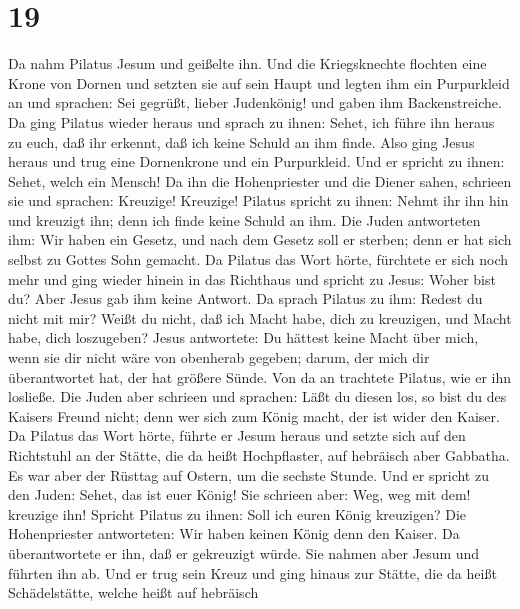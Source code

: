 \hypertarget{section-18}{%
\section{19}\label{section-18}}

 Da nahm Pilatus Jesum und geißelte ihn.  Und
die Kriegsknechte flochten eine Krone von Dornen und setzten sie auf
sein Haupt und legten ihm ein Purpurkleid an  und sprachen:
Sei gegrüßt, lieber Judenkönig! und gaben ihm Backenstreiche.
 Da ging Pilatus wieder heraus und sprach zu ihnen: Sehet,
ich führe ihn heraus zu euch, daß ihr erkennt, daß ich keine Schuld an
ihm finde.  Also ging Jesus heraus und trug eine Dornenkrone
und ein Purpurkleid. Und er spricht zu ihnen: Sehet, welch ein Mensch!
 Da ihn die Hohenpriester und die Diener sahen, schrieen sie
und sprachen: Kreuzige! Kreuzige! Pilatus spricht zu ihnen: Nehmt ihr
ihn hin und kreuzigt ihn; denn ich finde keine Schuld an ihm.
 Die Juden antworteten ihm: Wir haben ein Gesetz, und nach
dem Gesetz soll er sterben; denn er hat sich selbst zu Gottes Sohn
gemacht.  Da Pilatus das Wort hörte, fürchtete er sich noch
mehr  und ging wieder hinein in das Richthaus und spricht zu
Jesus: Woher bist du? Aber Jesus gab ihm keine Antwort.  Da
sprach Pilatus zu ihm: Redest du nicht mit mir? Weißt du nicht, daß ich
Macht habe, dich zu kreuzigen, und Macht habe, dich loszugeben?
 Jesus antwortete: Du hättest keine Macht über mich, wenn
sie dir nicht wäre von obenherab gegeben; darum, der mich dir
überantwortet hat, der hat größere Sünde.  Von da an
trachtete Pilatus, wie er ihn losließe. Die Juden aber schrieen und
sprachen: Läßt du diesen los, so bist du des Kaisers Freund nicht; denn
wer sich zum König macht, der ist wider den Kaiser.  Da
Pilatus das Wort hörte, führte er Jesum heraus und setzte sich auf den
Richtstuhl an der Stätte, die da heißt Hochpflaster, auf hebräisch aber
Gabbatha.  Es war aber der Rüsttag auf Ostern, um die
sechste Stunde. Und er spricht zu den Juden: Sehet, das ist euer König!
 Sie schrieen aber: Weg, weg mit dem! kreuzige ihn! Spricht
Pilatus zu ihnen: Soll ich euren König kreuzigen? Die Hohenpriester
antworteten: Wir haben keinen König denn den Kaiser.  Da
überantwortete er ihn, daß er gekreuzigt würde. Sie nahmen aber Jesum
und führten ihn ab.  Und er trug sein Kreuz und ging hinaus
zur Stätte, die da heißt Schädelstätte, welche heißt auf hebräisch
